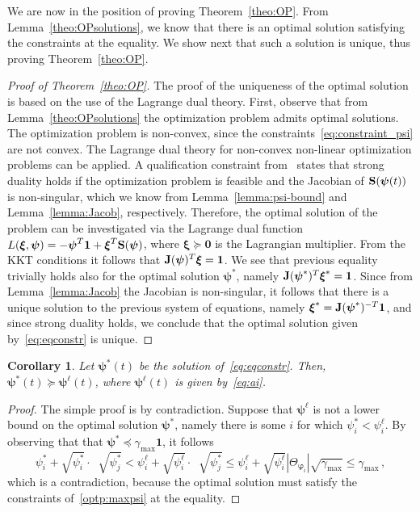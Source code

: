 \documentclass[a4paper,notitlepage,onecolumn]{article}
\def\1{\mathbf{1}}
\def\0{\mathbf{0}}
\def\S{{\bf S}}
\def\J{{\bf J}}
\def\psib{\boldsymbol{\psi}}
\def\varphib{\boldsymbol{\varphi}}
\def\xib{\boldsymbol{\xi}}
\newtheorem{corollary}[theorem]{Corollary}
\numberwithin{equation}{section}
\begin{document}
We are now in the position of proving Theorem~\ref{theo:OP}. From
Lemma~\ref{theo:OPsolutions}, we know that there is an optimal
solution satisfying the constraints at the equality. We show next
that such a solution is unique, thus proving
Theorem~\ref{theo:OP}.
\begin{proof}[Proof of Theorem~\ref{theo:OP}]
The proof of the uniqueness of the optimal solution is based on
the use of the Lagrange dual theory. First, observe that from
Lemma~\ref{theo:OPsolutions} the optimization problem admits
optimal solutions. The optimization problem is non-convex, since
the constraints~\eqref{eq:constraint_psi} are not convex. The
Lagrange dual theory for non-convex non-linear optimization
problems can be applied. A qualification constraint
from~\cite[pag. 25]{Horst+} states that strong duality holds if
the optimization problem is feasible and the Jacobian of
$\S(\psib(t))$ is non-singular, which we know from
Lemma~\ref{lemma:psi-bound} and Lemma~\ref{lemma:Jacob},
respectively. Therefore, the optimal solution of the problem can
be investigated via the Lagrange dual function $L(\xib,\psib) = -
\psib^T \1  + \xib^T \S(\psib)$, where $\xib\succeq \0$ is the
Lagrangian multiplier. From the KKT conditions it follows that
$\J(\psib)^T \xib  = \1 $. We see that previous equality trivially
holds also for the optimal solution $\psib^*$, namely
$\J(\psib^*)^T \xib^* = \1$. Since from Lemma~\ref{lemma:Jacob}
the Jacobian is non-singular, it follows that there is a unique
solution to the previous system of equations, namely
$\xib^*=\J(\psib^*)^{-T}\1$, and since strong duality holds, we
conclude that the optimal solution given by~\eqref{eq:eqconstr} is
unique.
\end{proof}

\begin{corollary} \label{cor:lower-bound-opt-sol}
Let $\psib^*(t)$ be the solution of~\ref{eq:eqconstr}. Then,
$\psib^*(t) \succeq \psib^\ell(t)$, where $\psib^\ell(t)$ is given
by~\eqref{eq:ai}.
\end{corollary}
\begin{proof}
The simple proof is by contradiction. Suppose that $\psib^\ell$ is not a lower bound on the optimal solution $\psib^*$, namely there is some $i$ for which $\psi_i^* < \psi_i^\ell$. By observing that that $\psib^* \preceq \gamma_{\max}\1$, it follows
$$\psi_i^* +  \sqrt{\psi_i^*} \cdot
    \mathop{\sum_{j\in \Theta_{\varphib_i}}}\sqrt{\psi_j^*} < \psi_i^\ell+ \sqrt{\psi_i^\ell} \cdot
    \mathop{\sum_{j\in \Theta_{\varphib_i}}}\sqrt{\psi_j^*} \leq  \psi_i^\ell+ \sqrt{\psi_i^\ell} |\Theta_{\varphib_i}|\sqrt{\gamma_{\max}} \leq \gamma_{\max} \,,
$$
which is a contradiction, because the optimal solution must satisfy the constraints of~\ref{optp:maxpsi} at the equality.
\end{proof}
\end{document}
